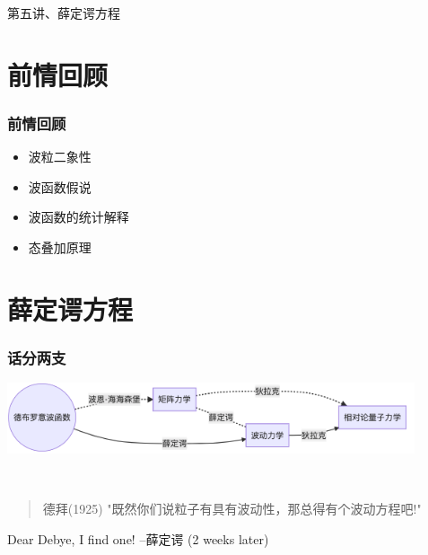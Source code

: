 
\begin{frame}
    \frametitle{}
    \begin{center}
    { {\huge 第五讲、薛定谔方程}}
    \end{center}    
\end{frame}


\section{前情回顾}

\begin{frame}
    \frametitle{前情回顾}
    \begin{itemize}
        \item 波粒二象性
        \item 波函数假说
        \item 波函数的统计解释
        \item 态叠加原理
    \end{itemize}
\end{frame}  

\section{薛定谔方程}

\begin{frame}
    \frametitle{话分两支}
    \begin{center}
        \includegraphics[width=0.9\textwidth]{figs/2021-12-06-16-22-39.png}\\   
    \end{center}
    ~~\\
        \begin{quotation}{德拜(1925)}
            "既然你们说粒子有具有波动性，那总得有个波动方程吧!"
        \end{quotation}
\end{frame}

\begin{frame}
    \begin{tcolorbox}[colback=yellow!10,colframe=red!75!black,title=]
        Dear Debye, I find one!\hspace{3cm} --薛定谔 (2 weeks later)
    \end{tcolorbox}
\end{frame}

